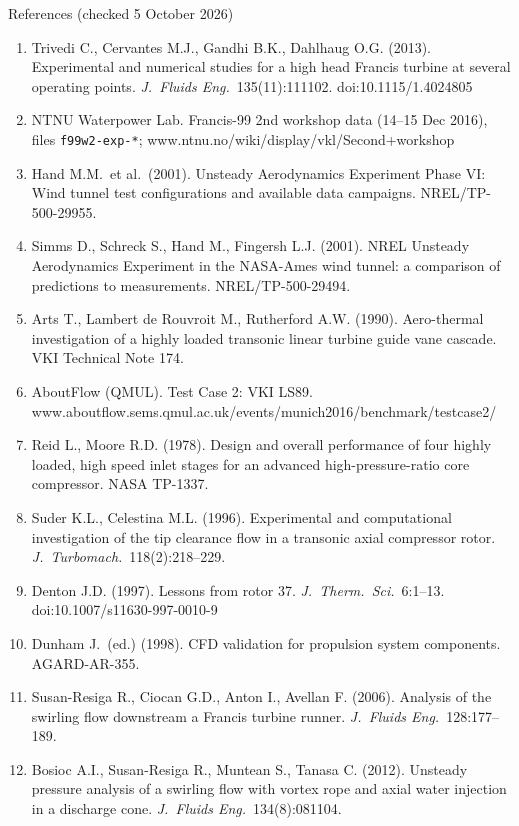 \documentclass[aspectratio=169,10pt]{beamer}
\begin{document}
\begin{frame}[allowframebreaks]{References (checked 5 October 2026)}
\fontsize{6.6}{7.8}\selectfont
\begin{enumerate}\setlength{\itemsep}{0.5pt}
\item Trivedi C., Cervantes M.J., Gandhi B.K., Dahlhaug O.G. (2013). Experimental and numerical studies for a high head Francis turbine at several operating points. \emph{J.\ Fluids Eng.}\ 135(11):111102. doi:10.1115/1.4024805
\item NTNU Waterpower Lab. Francis-99 2nd workshop data (14--15 Dec 2016), files \texttt{f99w2-exp-*}; www.ntnu.no/wiki/display/vkl/Second+workshop
\item Hand M.M.\ et al.\ (2001). Unsteady Aerodynamics Experiment Phase VI: Wind tunnel test configurations and available data campaigns. NREL/TP-500-29955.
\item Simms D., Schreck S., Hand M., Fingersh L.J. (2001). NREL Unsteady Aerodynamics Experiment in the NASA-Ames wind tunnel: a comparison of predictions to measurements. NREL/TP-500-29494.
\item Arts T., Lambert de Rouvroit M., Rutherford A.W. (1990). Aero-thermal investigation of a highly loaded transonic linear turbine guide vane cascade. VKI Technical Note 174.
\item AboutFlow (QMUL). Test Case 2: VKI LS89. www.aboutflow.sems.qmul.ac.uk/events/munich2016/benchmark/testcase2/
\item Reid L., Moore R.D. (1978). Design and overall performance of four highly loaded, high speed inlet stages for an advanced high-pressure-ratio core compressor. NASA TP-1337.
\item Suder K.L., Celestina M.L. (1996). Experimental and computational investigation of the tip clearance flow in a transonic axial compressor rotor. \emph{J.\ Turbomach.}\ 118(2):218--229.
\item Denton J.D. (1997). Lessons from rotor 37. \emph{J.\ Therm.\ Sci.}\ 6:1--13. doi:10.1007/s11630-997-0010-9
\item Dunham J.\ (ed.) (1998). CFD validation for propulsion system components. AGARD-AR-355.
\item Susan-Resiga R., Ciocan G.D., Anton I., Avellan F. (2006). Analysis of the swirling flow downstream a Francis turbine runner. \emph{J.\ Fluids Eng.}\ 128:177--189.
\item Bosioc A.I., Susan-Resiga R., Muntean S., Tanasa C. (2012). Unsteady pressure analysis of a swirling flow with vortex rope and axial water injection in a discharge cone. \emph{J.\ Fluids Eng.}\ 134(8):081104.

\end{enumerate}
\end{frame}
\end{document}
